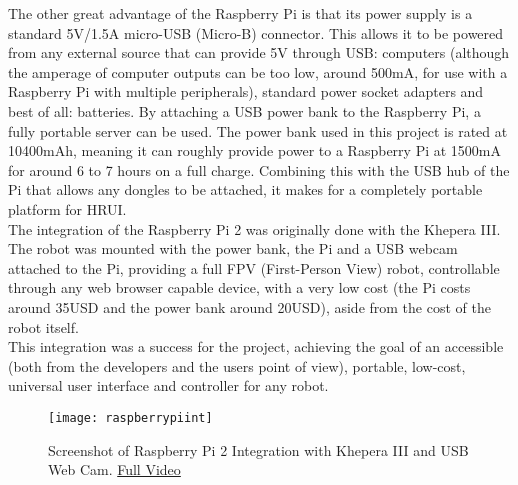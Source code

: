 The other great advantage of the Raspberry Pi is that its power supply is a standard 5V/1.5A micro-USB (Micro-B) connector. This allows 
it to be powered from any external source that can provide 5V through USB: computers (although the amperage of computer outputs can be 
too low, around 500mA, for use with a Raspberry Pi with multiple peripherals), standard power socket adapters and best of all: 
batteries. By attaching a USB power bank to the Raspberry Pi, a fully portable server can be used. The power bank used in this project 
is rated at 10400mAh, meaning it can roughly provide power to a Raspberry Pi at 1500mA for around 6 to 7 hours on a full charge. 
Combining this with the USB hub of the Pi that allows any dongles to be attached, it makes for a completely portable platform for HRUI.\\

The integration of the Raspberry Pi 2 was originally done with the Khepera III. The robot was mounted with the power bank, the Pi and a 
USB webcam attached to the Pi, providing a full FPV (First-Person View) robot, controllable through any web browser capable device, with 
a very low cost (the Pi costs around 35USD and the power bank around 20USD), aside from the cost of the robot itself.\\

This integration was a success for the project, achieving the goal of an accessible (both from the developers and the users point of
view), portable, low-cost, universal user interface and controller for any robot.
\begin{figure}[H]
\centering
\captionsetup{justification=centering}
\texttt{[image: raspberrypiint]}
\caption{Screenshot of Raspberry Pi 2 Integration with Khepera III and USB Web Cam. 
\href{https://www.youtube.com/watch?v=HtgBNOEmj6w}{Full Video}\label{kheperaiiidemo}}
\end{figure}